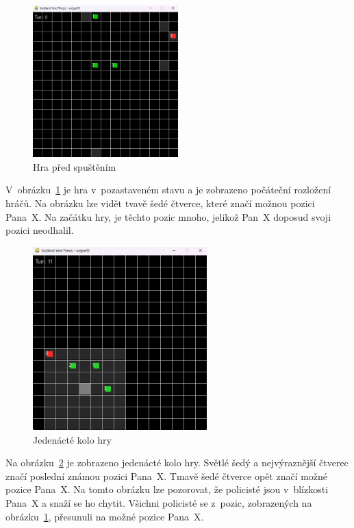 \begin{figure}[H]
	\centering
	\includegraphics[width=0.5\textwidth]{obrazky-figures/game_0}
    \caption{Hra před spuštěním}
    \label{fig:game_0}
\end{figure}

V~obrázku~\ref{fig:game_0} je hra v~pozastaveném stavu a je zobrazeno počáteční rozložení hráčů.
Na obrázku lze vidět tvavě šedé čtverce, které značí možnou pozici Pana~X\@.
Na začátku hry, je těchto pozic mnoho, jelikož Pan~X doposud svoji pozici neodhalil.

\begin{figure}[H]
	\centering
	\includegraphics[width=0.6\textwidth]{obrazky-figures/game_11}
      \caption{Jedenácté kolo hry}
    \label{fig:game_11}
\end{figure}

Na obrázku~\ref{fig:game_11} je zobrazeno jedenácté kolo hry.
Světlé šedý a nejvýraznější čtverec značí poslední známou pozici Pana~X\@.
Tmavě šedé čtverce opět značí možné pozice Pana~X\@.
Na tomto obrázku lze pozorovat, že policisté jsou v~blízkosti Pana~X a snaží se ho chytit.
Všichni policisté se z~pozic, zobrazených na obrázku~\ref{fig:game_0}, přesunuli na možné pozice Pana~X\@.

